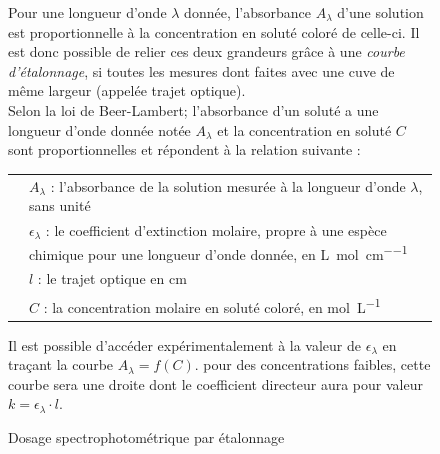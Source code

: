\documentclass[a4paper,12pt,fleqn]{article}%
\begin{document}
	\begin{figure}[h!]
		\caption{Dosage spectrophotométrique par étalonnage}
		\label{doc3}
		Pour une longueur d'onde $\lambda$ donnée, l'absorbance $A_\lambda$ d'une solution est proportionnelle à la concentration en soluté coloré de celle-ci. Il est donc possible de relier ces deux grandeurs grâce à une \emph{courbe d'étalonnage}, si toutes les mesures dont faites avec une cuve de même largeur (appelée trajet optique).\\
		Selon la loi de Beer-Lambert; l'absorbance d'un soluté a une longueur d'onde donnée notée $A_\lambda$ et la concentration en soluté $C$ sont proportionnelles et répondent à la relation suivante :\\
		\begin{tabular}{>{\centering} m{4cm}|m{14cm}}
			
			\multirow{4}{*}{$A_\lambda = \epsilon \cdot l \cdot C$} & $A_\lambda$ : l'absorbance de la solution mesurée à la longueur d'onde $\lambda$, sans unité\\
			& $\epsilon_\lambda$ : le coefficient d'extinction molaire, propre à une espèce chimique pour une longueur d'onde donnée, en \unit{\liter \per\mole\per\centi\meter}\\
			& $l$ : le trajet optique en \unit{\centi\meter}\\
			& $C$ : la concentration molaire en soluté coloré, en \unit{\mole\per\liter}\\
		\end{tabular}
				
		Il est possible d'accéder expérimentalement à la valeur de $\epsilon_\lambda$ en traçant la courbe $A_\lambda = f(C)$. pour des concentrations faibles, cette courbe sera une droite dont le coefficient directeur aura pour valeur $k=\epsilon_\lambda \cdot l$.
	\end{figure}
\end{document}
